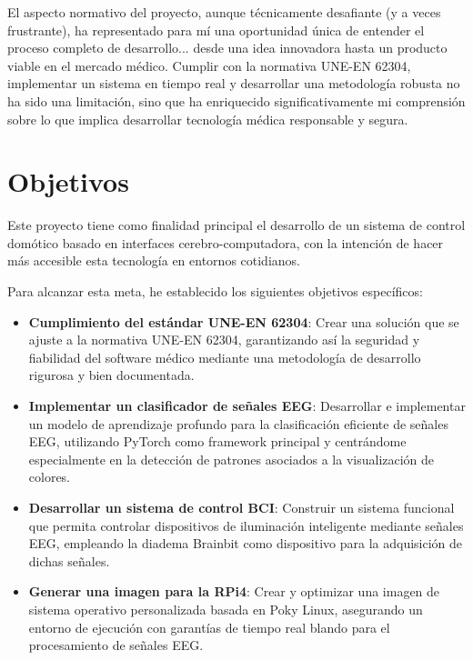El aspecto normativo del proyecto, aunque técnicamente desafiante (y a veces frustrante), ha representado para mí una oportunidad única de entender el proceso completo de desarrollo... desde una idea innovadora hasta un producto viable en el mercado médico. Cumplir con la normativa UNE-EN 62304, implementar un sistema en tiempo real y desarrollar una metodología robusta no ha sido una limitación, sino que ha enriquecido significativamente mi comprensión sobre lo que implica desarrollar tecnología médica responsable y segura.

\section{Objetivos}
Este proyecto tiene como finalidad principal el desarrollo de un sistema de control domótico basado en interfaces cerebro-computadora, con la intención de hacer más accesible esta tecnología en entornos cotidianos.

Para alcanzar esta meta, he establecido los siguientes objetivos específicos:

\begin{itemize}
    \item \textbf{Cumplimiento del estándar UNE-EN 62304}: Crear una solución que se ajuste a la normativa UNE-EN 62304, garantizando así la seguridad y fiabilidad del software médico mediante una metodología de desarrollo rigurosa y bien documentada.
    
    \item \textbf{Implementar un clasificador de señales EEG}: Desarrollar e implementar un modelo de aprendizaje profundo para la clasificación eficiente de señales EEG, utilizando PyTorch como framework principal y centrándome especialmente en la detección de patrones asociados a la visualización de colores.
    
    \item \textbf{Desarrollar un sistema de control BCI}: Construir un sistema funcional que permita controlar dispositivos de iluminación inteligente mediante señales EEG, empleando la diadema Brainbit como dispositivo para la adquisición de dichas señales.
    
    \item \textbf{Generar una imagen para la RPi4}: Crear y optimizar una imagen de sistema operativo personalizada basada en Poky Linux, asegurando un entorno de ejecución con garantías de tiempo real blando para el procesamiento de señales EEG.
\end{itemize}

